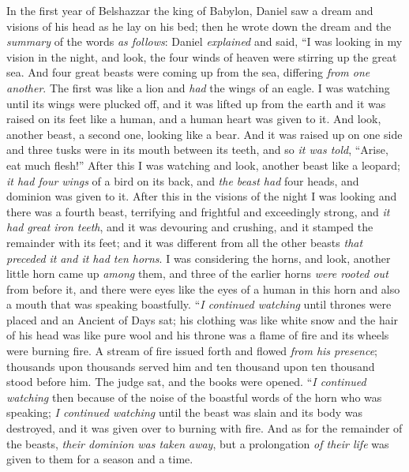 \begin{biblechapter} %
 In the first year of Belshazzar the king of Babylon, Daniel saw a dream and visions of his head as he lay on his bed; then he wrote down the dream and the \textit{summary} of the words \textit{as follows}:
\verse Daniel \textit{explained} and said, “I was looking in my vision in the night, and look, the four winds of heaven were stirring up the great sea.
\verse And four great beasts were coming up from the sea, differing \textit{from one another}.
\verse The first was like a lion and \textit{had} the wings of an eagle. I was watching until its wings were plucked off, and it was lifted up from the earth and it was raised on its feet like a human, and a human heart was given to it.
\verse And look, another beast, a second one, looking like a bear. And it was raised up on one side and three tusks were in its mouth between its teeth, and so \textit{it was told}, “Arise, eat much flesh!”
\verse After this I was watching and look, another beast like a leopard; \textit{it had four wings} of a bird on its back, and \textit{the beast had} four heads, and dominion was given to it.
\verse After this in the visions of the night I was looking and there was a fourth beast, terrifying and frightful and exceedingly strong, and \textit{it had} \textit{great iron teeth}, and it was devouring and crushing, and it stamped the remainder with its feet; and it was different from all the other beasts \textit{that preceded it} \textit{and it had ten horns}.
\verse I was considering the horns, and look, another little horn came up \textit{among} them, and three of the earlier horns \textit{were rooted out} from before it, and there were eyes like the eyes of a human in this horn and also a mouth that was speaking boastfully.
\verse “\textit{I continued watching} until thrones were placed and an Ancient of Days sat; his clothing was like white snow and the hair of his head was like pure wool and his throne was a flame of fire and its wheels were burning fire.
\verse A stream of fire issued forth and flowed \textit{from his presence}; thousands upon thousands served him and ten thousand upon ten thousand stood before him. The judge sat, and the books were opened.
\verse “\textit{I continued watching} then because of the noise of the boastful words of the horn who was speaking; \textit{I continued watching} until the beast was slain and its body was destroyed, and it was given over to burning with fire.
\verse And as for the remainder of the beasts, \textit{their dominion was taken away}, but a prolongation \textit{of their life} was given to them for a season and a time.

\end{biblechapter}
